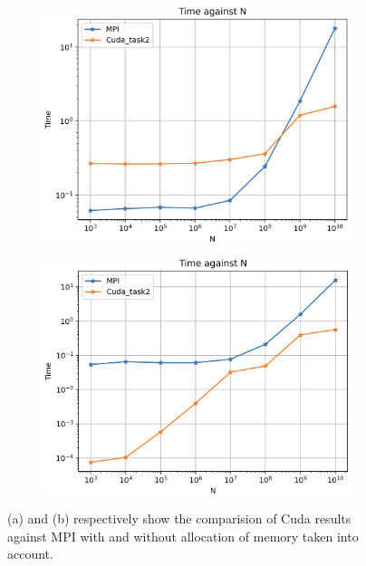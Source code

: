 \documentclass[12pt,a4paper]{article}
\begin{document}
\begin{figure}[H]
	\begin{subfigure}[b]{0.5\textwidth}
		\centering
		\includegraphics[width=1.0\linewidth]{"cuda_mpi"}
		\caption{}
		\label{fig:cudampi}
	\end{subfigure}
	\begin{subfigure}[b]{0.5\textwidth}
		\centering
		\includegraphics[width=1.0\linewidth]{"t2n"}
		\caption{}
		\label{fig:t2n}
	\end{subfigure}
	\caption{(a) and (b) respectively show the comparision of Cuda results against MPI  with and without allocation of memory taken into account.}
\end{figure}
\end{document}
